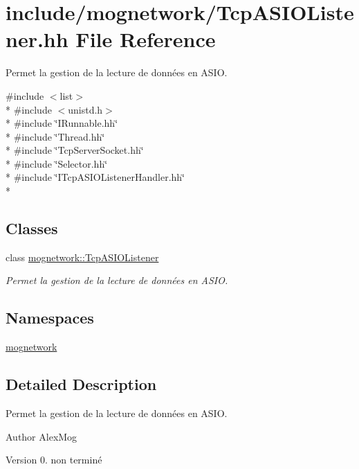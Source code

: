 \hypertarget{_tcp_a_s_i_o_listener_8hh}{\section{include/mognetwork/\-Tcp\-A\-S\-I\-O\-Listener.hh File Reference}
\label{_tcp_a_s_i_o_listener_8hh}
}


Permet la gestion de la lecture de données en A\-S\-I\-O.  


{\ttfamily \#include $<$list$>$}\\*
{\ttfamily \#include $<$unistd.\-h$>$}\\*
{\ttfamily \#include \char`\"{}I\-Runnable.\-hh\char`\"{}}\\*
{\ttfamily \#include \char`\"{}Thread.\-hh\char`\"{}}\\*
{\ttfamily \#include \char`\"{}Tcp\-Server\-Socket.\-hh\char`\"{}}\\*
{\ttfamily \#include \char`\"{}Selector.\-hh\char`\"{}}\\*
{\ttfamily \#include \char`\"{}I\-Tcp\-A\-S\-I\-O\-Listener\-Handler.\-hh\char`\"{}}\\*
\subsection*{Classes}
\begin{DoxyCompactItemize}
\item 
class \hyperlink{classmognetwork_1_1_tcp_a_s_i_o_listener}{mognetwork\-::\-Tcp\-A\-S\-I\-O\-Listener}
\begin{DoxyCompactList}\small\item\em Permet la gestion de la lecture de données en A\-S\-I\-O. \end{DoxyCompactList}\end{DoxyCompactItemize}
\subsection*{Namespaces}
\begin{DoxyCompactItemize}
\item 
\hyperlink{namespacemognetwork}{mognetwork}
\end{DoxyCompactItemize}


\subsection{Detailed Description}
Permet la gestion de la lecture de données en A\-S\-I\-O. \begin{DoxyAuthor}{Author}
Alex\-Mog 
\end{DoxyAuthor}
\begin{DoxyVersion}{Version}
0.  non terminé 
\end{DoxyVersion}
